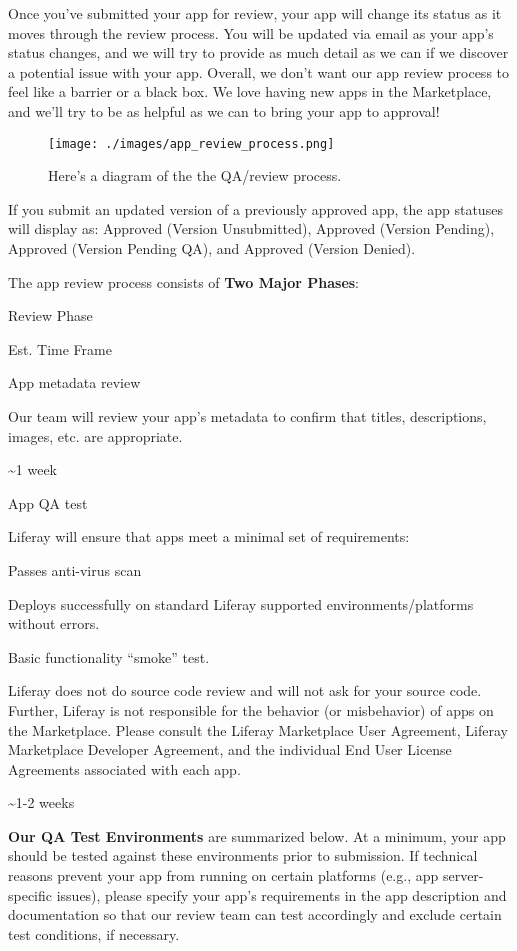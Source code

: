 \noindent\hrulefill

Once you've submitted your app for review, your app will change its
status as it moves through the review process. You will be updated via
email as your app's status changes, and we will try to provide as much
detail as we can if we discover a potential issue with your app.
Overall, we don't want our app review process to feel like a barrier or
a black box. We love having new apps in the Marketplace, and we'll try
to be as helpful as we can to bring your app to approval!

\begin{figure}
\centering
\texttt{[image: ./images/app\_review\_process.png]}
\caption{Here's a diagram of the the QA/review process.}
\end{figure}

If you submit an updated version of a previously approved app, the app
statuses will display as: Approved (Version Unsubmitted), Approved
(Version Pending), Approved (Version Pending QA), and Approved (Version
Denied).

The app review process consists of \textbf{Two Major Phases}:

\label{article-33460874}
Review Phase

Est. Time Frame

App metadata review

Our team will review your app's metadata to confirm that titles,
descriptions, images, etc. are appropriate.

\textasciitilde1 week

App QA test

Liferay will ensure that apps meet a minimal set of requirements:

Passes anti-virus scan

Deploys successfully on standard Liferay supported
environments/platforms without errors.

Basic functionality ``smoke'' test.

Liferay does not do source code review and will not ask for your source
code. Further, Liferay is not responsible for the behavior (or
misbehavior) of apps on the Marketplace. Please consult the Liferay
Marketplace User Agreement, Liferay Marketplace Developer Agreement, and
the individual End User License Agreements associated with each app.

\textasciitilde1-2 weeks

\textbf{Our QA Test Environments} are summarized below. At a minimum,
your app should be tested against these environments prior to
submission. If technical reasons prevent your app from running on
certain platforms (e.g., app server-specific issues), please specify
your app's requirements in the app description and documentation so that
our review team can test accordingly and exclude certain test
conditions, if necessary.

